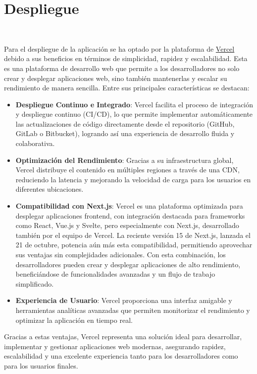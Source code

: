 \section{Despliegue}~\label{sec:despliegue}

Para el despliegue de la aplicación se ha optado por la plataforma de \href{https://vercel.com/home}{Vercel} debido a sus beneficios en términos de simplicidad, rapidez y escalabilidad. Esta es una plataforma de desarrollo web que permite a los desarrolladores no solo crear y desplegar aplicaciones web, sino también mantenerlas y escalar su rendimiento de manera sencilla. Entre sus principales características se destacan:

\begin{itemize}
    \item \textbf{Despliegue Continuo e Integrado}: Vercel facilita el proceso de integración y despliegue continuo (CI/CD), lo que permite implementar automáticamente las actualizaciones de código directamente desde el repositorio (GitHub, GitLab o Bitbucket), logrando así una experiencia de desarrollo fluida y colaborativa.
    \item \textbf{Optimización del Rendimiento}: Gracias a su infraestructura global, Vercel distribuye el contenido en múltiples regiones a través de una CDN, reduciendo la latencia y mejorando la velocidad de carga para los usuarios en diferentes ubicaciones.
    \item \textbf{Compatibilidad con Next.js}: Vercel es una plataforma optimizada para desplegar aplicaciones frontend, con integración destacada para frameworks como React, Vue.js y Svelte, pero especialmente con Next.js, desarrollado también por el equipo de Vercel. La reciente versión 15 de Next.js, lanzada el 21 de octubre, potencia aún más esta compatibilidad, permitiendo aprovechar sus ventajas sin complejidades adicionales. Con esta combinación, los desarrolladores pueden crear y desplegar aplicaciones de alto rendimiento, beneficiándose de funcionalidades avanzadas y un flujo de trabajo simplificado.
    \item \textbf{Experiencia de Usuario}: Vercel proporciona una interfaz amigable y herramientas analíticas avanzadas que permiten monitorizar el rendimiento y optimizar la aplicación en tiempo real.
\end{itemize}

Gracias a estas ventajas, Vercel representa una solución ideal para desarrollar, implementar y gestionar aplicaciones web modernas, asegurando rapidez, escalabilidad y una excelente experiencia tanto para los desarrolladores como para los usuarios finales.

